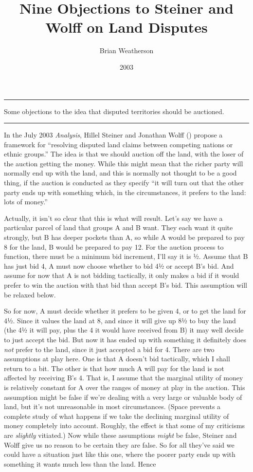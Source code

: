 \documentclass[
  10pt,
  letterpaper,
  DIV=11,
  numbers=noendperiod,
  twoside]{scrartcl}
\title{Nine Objections to Steiner and Wolff on Land Disputes}
\author{Brian Weatherson}
\date{2003}
\renewenvironment{abstract}
 {\vspace{-1.25cm}
 \quotation\small\noindent\rule{\linewidth}{.5pt}\par\smallskip
 \noindent }
 {\par\noindent\rule{\linewidth}{.5pt}\endquotation}
\begin{document}
\maketitle
\begin{abstract}
Some objections to the idea that disputed territories should be
auctioned.
\end{abstract}


In the July 2003 \emph{Analysis}, Hillel Steiner and Jonathan Wolff
() propose a framework for ``resolving
disputed land claims between competing nations or ethnic groups.'' The
idea is that we should auction off the land, with the loser of the
auction getting the money. While this might mean that the richer party
will normally end up with the land, and this is normally not thought to
be a good thing, if the auction is conducted as they specify ``it will
turn out that the other party ends up with something which, in the
circumstances, it prefers to the land: lots of money.''

Actually, it isn't so clear that this is what will result. Let's say we
have a particular parcel of land that groups A and B want. They each
want it quite strongly, but B has deeper pockets than A, so while A
would be prepared to pay 8 for the land, B would be prepared to pay 12.
For the auction process to function, there must be a minimum bid
increment, I'll say it is ½. Assume that B has just bid 4, A must now
choose whether to bid 4½ or accept B's bid. And assume for now that A is
not bidding tactically, it only makes a bid if it would prefer to win
the auction with that bid than accept B's bid. This assumption will be
relaxed below.

So for now, A must decide whether it prefers to be given 4, or to get
the land for 4½. Since it values the land at 8, and since it will give
up 8½ to buy the land (the 4½ it will pay, plus the 4 it would have
received from B) it may well decide to just accept the bid. But now it
has ended up with something it definitely does \emph{not} prefer to the
land, since it just accepted a bid for 4. There are two assumptions at
play here. One is that A doesn't bid tactically, which I shall return to
a bit. The other is that how much A will pay for the land is not
affected by receiving B's 4. That is, I assume that the marginal utility
of money is relatively constant for A over the ranges of money at play
in the auction. This assumption might be false if we're dealing with a
very large or valuable body of land, but it's not unreasonable in most
circumstances. (Space prevents a complete study of what happens if we
take the declining marginal utility of money completely into account.
Roughly, the effect is that some of my criticisms are \emph{slightly}
vitiated.) Now while these assumptions \emph{might} be false, Steiner
and Wolff give us no reason to be certain they are false. So for all
they've said we could have a situation just like this one, where the
poorer party ends up with something it wants much less than the land.
Hence
\end{document}
